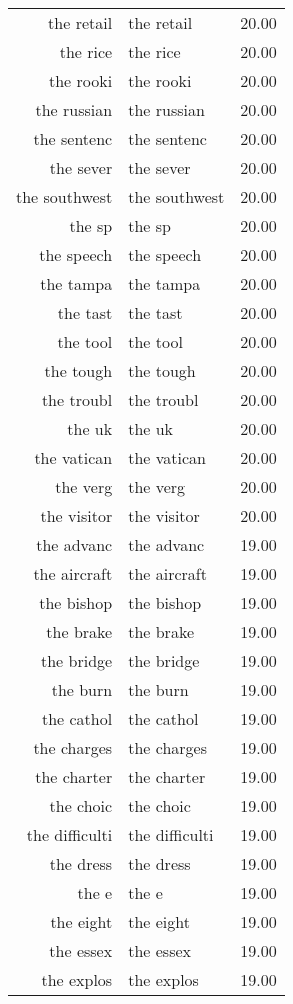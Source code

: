 \begin{table}[ht]
\begin{tabular}{rlr}
  the retail & the retail & 20.00 \\ 
  the rice & the rice & 20.00 \\ 
  the rooki & the rooki & 20.00 \\ 
  the russian & the russian & 20.00 \\ 
  the sentenc & the sentenc & 20.00 \\ 
  the sever & the sever & 20.00 \\ 
  the southwest & the southwest & 20.00 \\ 
  the sp & the sp & 20.00 \\ 
  the speech & the speech & 20.00 \\ 
  the tampa & the tampa & 20.00 \\ 
  the tast & the tast & 20.00 \\ 
  the tool & the tool & 20.00 \\ 
  the tough & the tough & 20.00 \\ 
  the troubl & the troubl & 20.00 \\ 
  the uk & the uk & 20.00 \\ 
  the vatican & the vatican & 20.00 \\ 
  the verg & the verg & 20.00 \\ 
  the visitor & the visitor & 20.00 \\ 
  the advanc & the advanc & 19.00 \\ 
  the aircraft & the aircraft & 19.00 \\ 
  the bishop & the bishop & 19.00 \\ 
  the brake & the brake & 19.00 \\ 
  the bridge & the bridge & 19.00 \\ 
  the burn & the burn & 19.00 \\ 
  the cathol & the cathol & 19.00 \\ 
  the charges & the charges & 19.00 \\ 
  the charter & the charter & 19.00 \\ 
  the choic & the choic & 19.00 \\ 
  the difficulti & the difficulti & 19.00 \\ 
  the dress & the dress & 19.00 \\ 
  the e & the e & 19.00 \\ 
  the eight & the eight & 19.00 \\ 
  the essex & the essex & 19.00 \\ 
  the explos & the explos & 19.00 \\ 

\end{tabular}
\end{table}
